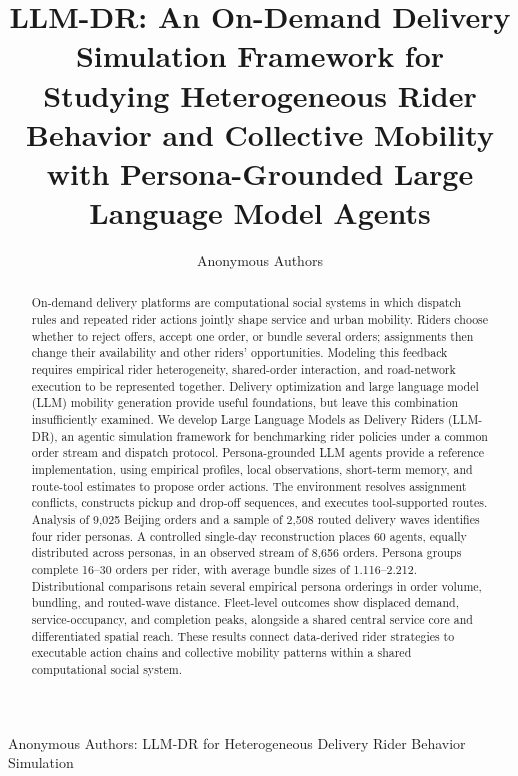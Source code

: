 \documentclass[letterpaper,journal]{IEEEtran}
\begin{document}
\title{LLM-DR: An On-Demand Delivery Simulation Framework for Studying Heterogeneous Rider Behavior and Collective Mobility with Persona-Grounded Large Language Model Agents}

\author{Anonymous Authors}

%
{Anonymous Authors: LLM-DR for Heterogeneous Delivery Rider Behavior Simulation}

\maketitle
\raggedbottom

\begin{abstract}
On-demand delivery platforms are computational social systems in which dispatch rules and repeated rider actions jointly shape service and urban mobility. Riders choose whether to reject offers, accept one order, or bundle several orders; assignments then change their availability and other riders' opportunities. Modeling this feedback requires empirical rider heterogeneity, shared-order interaction, and road-network execution to be represented together. Delivery optimization and large language model (LLM) mobility generation provide useful foundations, but leave this combination insufficiently examined. We develop Large Language Models as Delivery Riders (LLM-DR), an agentic simulation framework for benchmarking rider policies under a common order stream and dispatch protocol. Persona-grounded LLM agents provide a reference implementation, using empirical profiles, local observations, short-term memory, and route-tool estimates to propose order actions. The environment resolves assignment conflicts, constructs pickup and drop-off sequences, and executes tool-supported routes. Analysis of 9,025 Beijing orders and a sample of 2,508 routed delivery waves identifies four rider personas. A controlled single-day reconstruction places 60 agents, equally distributed across personas, in an observed stream of 8,656 orders. Persona groups complete 16--30 orders per rider, with average bundle sizes of 1.116--2.212. Distributional comparisons retain several empirical persona orderings in order volume, bundling, and routed-wave distance. Fleet-level outcomes show displaced demand, service-occupancy, and completion peaks, alongside a shared central service core and differentiated spatial reach. These results connect data-derived rider strategies to executable action chains and collective mobility patterns within a shared computational social system.
\end{abstract}
\end{document}
